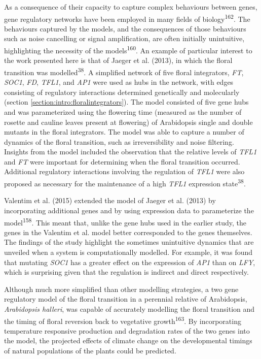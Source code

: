 \documentclass[12pt,]{book}
\begin{document}
As a consequence of their capacity to capture complex behaviours between
genes, gene regulatory networks have been employed in many fields of
biology\textsuperscript{162}. The behaviours captured by the models, and
the consequences of those behaviours such as noise cancelling or signal
amplification, are often initially unintuitive, highlighting the
necessity of the models\textsuperscript{160}. An example of particular
interest to the work presented here is that of Jaeger et al. (2013), in
which the floral transition was modelled\textsuperscript{38}. A
simplified network of five floral integrators, \emph{FT}, \emph{SOC1},
\emph{FD}, \emph{TFL1}, and \emph{AP1} were used as hubs in the network,
with edges consisting of regulatory interactions determined genetically
and molecularly (section \ref{section:intro:floralintegrators}). The
model consisted of five gene hubs and was parameterized using the
flowering time (measured as the number of rosette and cauline leaves
present at flowering) of Arabidopsis single and double mutants in the
floral integrators. The model was able to capture a number of dynamics
of the floral transition, such as irreversibility and noise filtering.
Insights from the model included the observation that the relative
levels of \emph{TFL1} and \emph{FT} were important for determining when
the floral transition occurred. Additional regulatory interactions
involving the regulation of \emph{TFL1} were also proposed as necessary
for the maintenance of a high \emph{TFL1} expression
state\textsuperscript{38}.

Valentim et al. (2015) extended the model of Jaeger et al. (2013) by
incorporating additional genes and by using expression data to
parameterize the model\textsuperscript{158}. This meant that, unlike the
gene hubs used in the earlier study, the genes in the Valentim et al.
model better corresponded to the genes themselves. The findings of the
study highlight the sometimes unintuitive dynamics that are unveiled
when a system is computationally modelled. For example, it was found
that mutating \emph{SOC1} has a greater effect on the expression of
\emph{AP1} than on \emph{LFY}, which is surprising given that the
regulation is indirect and direct respectively.

Although much more simplified than other modelling strategies, a two
gene regulatory model of the floral transition in a perennial relative
of Arabidopsis, \emph{Arabidopsis halleri}, was capable of accurately
modelling the floral transition and the timing of floral reversion back
to vegetative growth\textsuperscript{163}. By incorporating temperature
responsive production and degradation rates of the two genes into the
model, the projected effects of climate change on the developmental
timings of natural populations of the plants could be predicted.
\end{document}
